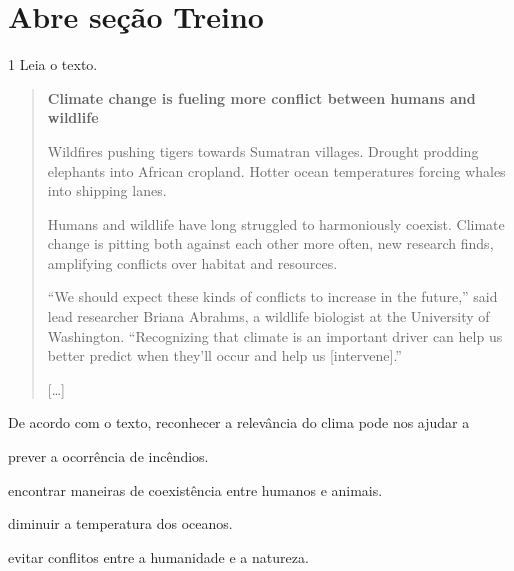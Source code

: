 
\section{Abre seção Treino}

\num{1} Leia o texto.

\begin{quote}
\textbf{Climate change is fueling more conflict between humans and wildlife}

Wildfires pushing tigers towards Sumatran villages. Drought prodding
elephants into African cropland. Hotter ocean temperatures forcing
whales into shipping lanes.

Humans and wildlife have long struggled to harmoniously coexist. Climate
change is pitting both against each other more often, new research
finds, amplifying conflicts over habitat and resources.

``We should expect these kinds of conflicts to increase in the future,''
said lead researcher Briana Abrahms, a wildlife biologist at the
University of Washington. ``Recognizing that climate is an important
driver can help us better predict when they'll occur and help us
{[}intervene{]}.''

{[}\ldots{}{]}

\end{quote}


De acordo com o texto, reconhecer a relevância do clima pode nos ajudar a

\begin{escolha}
\item prever a ocorrência de incêndios.

\item encontrar maneiras de coexistência entre humanos e animais.

\item diminuir a temperatura dos oceanos.

\item evitar conflitos entre a humanidade e a natureza.
\end{escolha}


